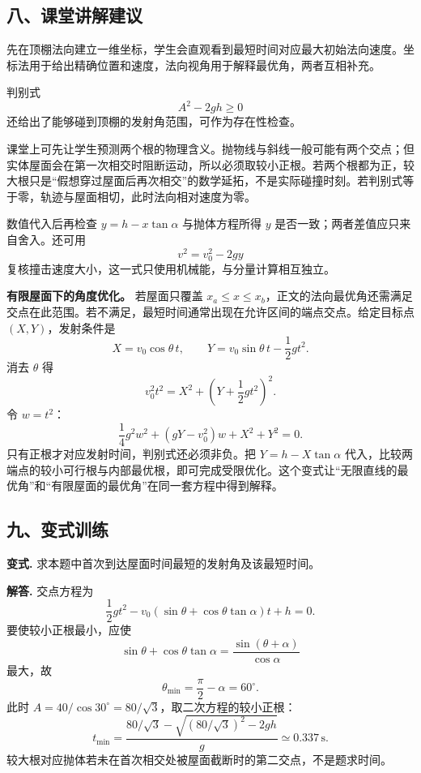 \documentclass[12pt,a4paper,UTF8]{ctexart}
\begin{document}
\subsection{八、课堂讲解建议}\label{ux516bux8bfeux5802ux8bb2ux89e3ux5efaux8bae-1}

先在顶棚法向建立一维坐标，学生会直观看到最短时间对应最大初始法向速度。坐标法用于给出精确位置和速度，法向视角用于解释最优角，两者互相补充。

判别式 \[
A^2-2gh\ge0
\] 还给出了能够碰到顶棚的发射角范围，可作为存在性检查。

课堂上可先让学生预测两个根的物理含义。抛物线与斜线一般可能有两个交点；但实体屋面会在第一次相交时阻断运动，所以必须取较小正根。若两个根都为正，较大根只是``假想穿过屋面后再次相交''的数学延拓，不是实际碰撞时刻。若判别式等于零，轨迹与屋面相切，此时法向相对速度为零。

数值代入后再检查 \(y=h-x\tan\alpha\) 与抛体方程所得 \(y\)
是否一致；两者差值应只来自舍入。还可用 \[
v^2=v_0^2-2gy
\] 复核撞击速度大小，这一式只使用机械能，与分量计算相互独立。

\textbf{有限屋面下的角度优化。} 若屋面只覆盖
\(x_a\le x\le x_b\)，正文的法向最优角还需满足交点在此范围。若不满足，最短时间通常出现在允许区间的端点交点。给定目标点
\((X,Y)\)，发射条件是 \[
X=v_0\cos\theta\,t,\qquad
Y=v_0\sin\theta\,t-\frac12gt^2.
\] 消去 \(\theta\) 得 \[
v_0^2t^2=X^2+\left(Y+\frac12gt^2\right)^2.
\] 令 \(w=t^2\)： \[
\frac14g^2w^2+(gY-v_0^2)w+X^2+Y^2=0.
\] 只有正根才对应发射时间，判别式还必须非负。把 \(Y=h-X\tan\alpha\)
代入，比较两端点的较小可行根与内部最优根，即可完成受限优化。这个变式让``无限直线的最优角''和``有限屋面的最优角''在同一套方程中得到解释。

\subsection{九、变式训练}\label{ux4e5dux53d8ux5f0fux8badux7ec3-1}

\textbf{变式.} 求本题中首次到达屋面时间最短的发射角及该最短时间。

\textbf{解答.} 交点方程为 \[
\frac12gt^2-v_0
(\sin\theta+\cos\theta\tan\alpha)t+h=0.
\] 要使较小正根最小，应使 \[
\sin\theta+\cos\theta\tan\alpha
=\frac{\sin(\theta+\alpha)}{\cos\alpha}
\] 最大，故 \[
\boxed{\theta_{\min}=\frac\pi2-\alpha=60^\circ}.
\] 此时 \(A=40/\cos30^\circ=80/\sqrt3\)，取二次方程的较小正根： \[
\boxed{t_{\min}=
\frac{80/\sqrt3-
\sqrt{(80/\sqrt3)^2-2gh}}{g}
\simeq0.337\,\mathrm s}.
\] 较大根对应抛体若未在首次相交处被屋面截断时的第二交点，不是题求时间。
\end{document}
